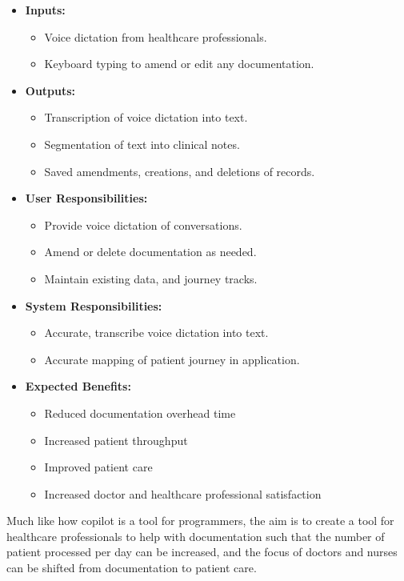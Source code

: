 \documentclass[12pt]{article}
\begin{document}
\begin{itemize}
  \item \textbf{Inputs:}
  \begin{itemize}
    \item Voice dictation from healthcare professionals.
    \item Keyboard typing to amend or edit any documentation.
  \end{itemize}
  \item \textbf{Outputs:}
  \begin{itemize}
    \item Transcription of voice dictation into text.
    \item Segmentation of text into clinical notes.
    \item Saved amendments, creations, and deletions of records.
  \end{itemize}
  \item \textbf{User Responsibilities:}
  \begin{itemize}
    \item Provide voice dictation of conversations.
    \item Amend or delete documentation as needed.
    \item Maintain existing data, and journey tracks.
  \end{itemize}
  \item \textbf{System Responsibilities:}
  \begin{itemize}
    \item Accurate, transcribe voice dictation into text.
    \item Accurate mapping of patient journey in application.
  \end{itemize}

\item{\textbf{Expected Benefits:}}

\begin{itemize}
  \item Reduced documentation overhead time
  \item Increased patient throughput
  \item Improved patient care
  \item Increased doctor and healthcare professional satisfaction
\end{itemize}
\end{itemize}
Much like how copilot is a tool for programmers, the aim is to create a tool for healthcare professionals to help with documentation such that the number of patient processed per day can be increased, and the focus of doctors and nurses can be shifted from documentation to patient care. 
\end{document}

